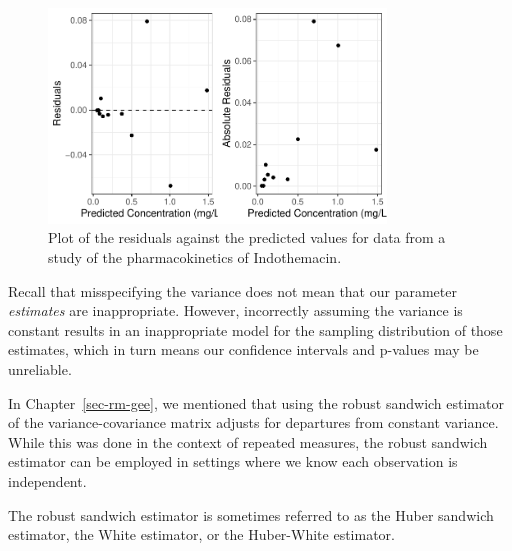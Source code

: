 \documentclass[
  letterpaper,
  DIV=11,
  numbers=noendperiod]{scrreprt}
\theoremstyle{definition}
\theoremstyle{definition}
\theoremstyle{remark}
\begin{document}
\begin{figure}

{\centering \includegraphics[width=0.8\textwidth,height=\textheight]{./images/fig-nlm-indometh-resids-1.pdf}

}

\caption{\label{fig-nlm-indometh-resids}Plot of the residuals against
the predicted values for data from a study of the pharmacokinetics of
Indothemacin.}

\end{figure}

Recall that misspecifying the variance does not mean that our parameter
\emph{estimates} are inappropriate. However, incorrectly assuming the
variance is constant results in an inappropriate model for the sampling
distribution of those estimates, which in turn means our confidence
intervals and p-values may be unreliable.

In Chapter~\ref{sec-rm-gee}, we mentioned that using the robust sandwich
estimator of the variance-covariance matrix adjusts for departures from
constant variance. While this was done in the context of repeated
measures, the robust sandwich estimator can be employed in settings
where we know each observation is independent.

\begin{tcolorbox}[enhanced jigsaw, left=2mm, toprule=.15mm, arc=.35mm, breakable, opacitybacktitle=0.6, opacityback=0, rightrule=.15mm, colbacktitle=quarto-callout-note-color!10!white, coltitle=black, leftrule=.75mm, toptitle=1mm, colframe=quarto-callout-note-color-frame, titlerule=0mm, title=\textcolor{quarto-callout-note-color}{\faInfo}\hspace{0.5em}{Note}, bottomrule=.15mm, colback=white, bottomtitle=1mm]

The robust sandwich estimator is sometimes referred to as the Huber
sandwich estimator, the White estimator, or the Huber-White estimator.

\end{tcolorbox}
\end{document}
